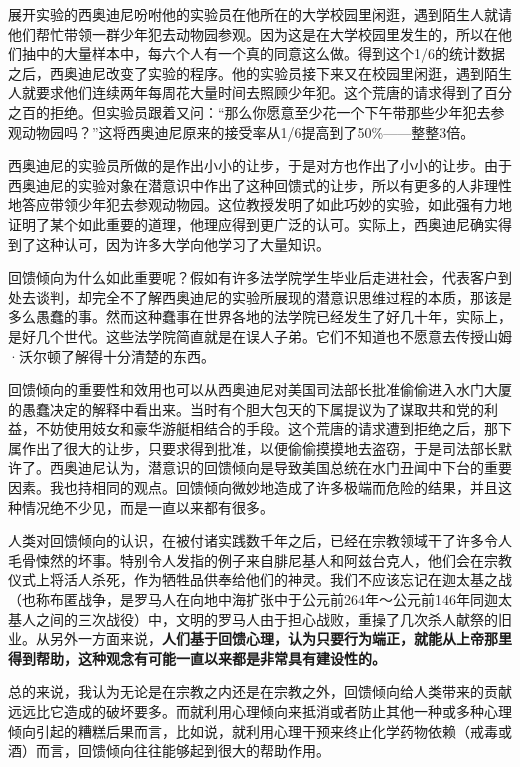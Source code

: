 展开实验的西奥迪尼吩咐他的实验员在他所在的大学校园里闲逛，遇到陌生人就请他们帮忙带领一群少年犯去动物园参观。因为这是在大学校园里发生的，所以在他们抽中的大量样本中，每六个人有一个真的同意这么做。得到这个1/6的统计数据之后，西奥迪尼改变了实验的程序。他的实验员接下来又在校园里闲逛，遇到陌生人就要求他们连续两年每周花大量时间去照顾少年犯。这个荒唐的请求得到了百分之百的拒绝。但实验员跟着又问：“那么你愿意至少花一个下午带那些少年犯去参观动物园吗？”这将西奥迪尼原来的接受率从1/6提高到了50\%——整整3倍。
\par

西奥迪尼的实验员所做的是作出小小的让步，于是对方也作出了小小的让步。由于西奥迪尼的实验对象在潜意识中作出了这种回馈式的让步，所以有更多的人非理性地答应带领少年犯去参观动物园。这位教授发明了如此巧妙的实验，如此强有力地证明了某个如此重要的道理，他理应得到更广泛的认可。实际上，西奥迪尼确实得到了这种认可，因为许多大学向他学习了大量知识。
\par

回馈倾向为什么如此重要呢？假如有许多法学院学生毕业后走进社会，代表客户到处去谈判，却完全不了解西奥迪尼的实验所展现的潜意识思维过程的本质，那该是多么愚蠢的事。然而这种蠢事在世界各地的法学院已经发生了好几十年，实际上，是好几个世代。这些法学院简直就是在误人子弟。它们不知道也不愿意去传授山姆·沃尔顿了解得十分清楚的东西。
\par

回馈倾向的重要性和效用也可以从西奥迪尼对美国司法部长批准偷偷进入水门大厦的愚蠢决定的解释中看出来。当时有个胆大包天的下属提议为了谋取共和党的利益，不妨使用妓女和豪华游艇相结合的手段。这个荒唐的请求遭到拒绝之后，那下属作出了很大的让步，只要求得到批准，以便偷偷摸摸地去盗窃，于是司法部长默许了。西奥迪尼认为，潜意识的回馈倾向是导致美国总统在水门丑闻中下台的重要因素。我也持相同的观点。回馈倾向微妙地造成了许多极端而危险的结果，并且这种情况绝不少见，而是一直以来都有很多。
\par

人类对回馈倾向的认识，在被付诸实践数千年之后，已经在宗教领域干了许多令人毛骨悚然的坏事。特别令人发指的例子来自腓尼基人和阿兹台克人，他们会在宗教仪式上将活人杀死，作为牺牲品供奉给他们的神灵。我们不应该忘记在迦太基之战（也称布匿战争，是罗马人在向地中海扩张中于公元前264年～公元前146年同迦太基人之间的三次战役）中，文明的罗马人由于担心战败，重操了几次杀人献祭的旧业。从另外一方面来说，\textbf{人们基于回馈心理，认为只要行为端正，就能从上帝那里得到帮助，这种观念有可能一直以来都是非常具有建设性的。}
\par

总的来说，我认为无论是在宗教之内还是在宗教之外，回馈倾向给人类带来的贡献远远比它造成的破坏要多。而就利用心理倾向来抵消或者防止其他一种或多种心理倾向引起的糟糕后果而言，比如说，就利用心理干预来终止化学药物依赖（戒毒或酒）而言，回馈倾向往往能够起到很大的帮助作用。
\par

